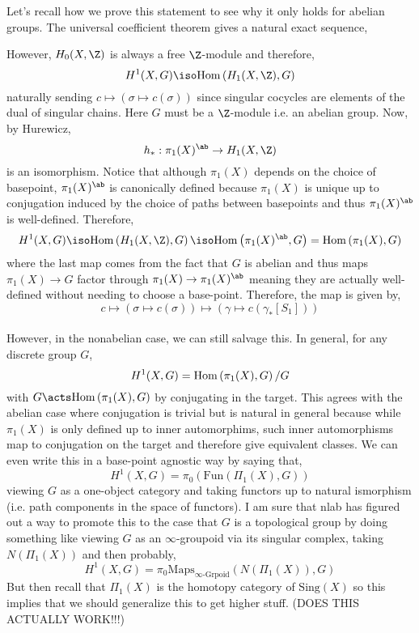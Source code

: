 \documentclass[12pt]{extarticle}
\begin{document}
Let's recall how we prove this statement to see why it only holds for abelian groups. The universal coefficient theorem gives a natural exact sequence,
\begin{center}
\end{center}
However, $H_0(X, \Z)$ is always a free $\Z$-module and therefore,
\[ H^1(X, G) \iso \Hom{H_1(X, \Z)}{G} \]
naturally sending $c \mapsto (\sigma \mapsto c(\sigma))$ since singular cocycles are elements of the dual of singular chains. Here $G$ must be a $\Z$-module i.e. an abelian group. Now, by Hurewicz,
\[ h_* : \pi_1(X)^\ab \to H_1(X, \Z) \]
is an isomorphism. Notice that although $\pi_1(X)$ depends on the choice of basepoint, $\pi_1(X)^\ab$ is canonically defined because $\pi_1(X)$ is unique up to conjugation induced by the choice of paths between basepoints and thus $\pi_1(X)^\ab$ is well-defined. Therefore,
\[ H^1(X, G) \iso \Hom{H_1(X, \Z)}{G} \iso \Hom{\pi_1(X)^\ab}{G} = \Hom{\pi_1(X)}{G} \]
where the last map comes from the fact that $G$ is abelian and thus maps $\pi_1(X) \to G$ factor through $\pi_1(X) \to \pi_1(X)^\ab$ meaning they are actually well-defined without needing to choose a base-point. Therefore, the map is given by,
\[ c \mapsto (\sigma \mapsto c(\sigma)) \mapsto (\gamma \mapsto c(\gamma_*[S_1])) \]
\bigskip\\
However, in the nonabelian case, we can still salvage this. In general, for any discrete group $G$,
\[ H^1(X, G) = \mathrm{Hom}\left( \pi_1(X), G \right)/G \]
with $G \acts \Hom{\pi_1(X)}{G}$ by conjugating in the target. This agrees with the abelian case where conjugation is trivial but is natural in general because while $\pi_1(X)$ is only defined up to inner automorphims, such inner automorphisms map to conjugation on the target and therefore give equivalent classes. We can even write this in a base-point agnostic way by saying that,
\[ H^1(X, G) = \pi_0(\mathrm{Fun}(\Pi_1(X), G)) \]
viewing $G$ as a one-object category and taking functors up to natural ismorphism (i.e. path components in the space of functors). I am sure that nlab has figured out a way to promote this to the case that $G$ is a topological group by doing something like viewing $G$ as an $\infty$-groupoid via its singular complex, taking $N(\Pi_1(X))$ and then probably,
\[ H^1(X, G) = \pi_0 \mathrm{Maps}_{\infty\text{-Grpoid}}\left( N(\Pi_1(X)), G \right) \]
But then recall that $\Pi_1(X)$ is the homotopy category of $\mathrm{Sing}(X)$ so this implies that we should generalize this to get higher stuff.
(DOES THIS ACTUALLY WORK!!!)
\end{document}
